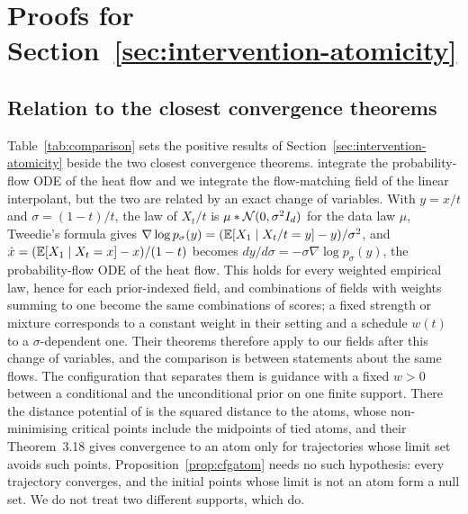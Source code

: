 \documentclass{article} %
\theoremstyle{plain}
\theoremstyle{definition}
\theoremstyle{remark}
\begin{document}
\section{Proofs for Section~\ref{sec:intervention-atomicity}}
\label{app:intervention-proofs}

\subsection{Relation to the closest convergence theorems}
\label{apx:comparison}

Table~\ref{tab:comparison} sets the positive results of Section~\ref{sec:intervention-atomicity}
beside the two closest convergence theorems. \citet{liu2025pde,liu2026geometric} integrate the
probability-flow ODE of the heat flow and we integrate the flow-matching field of the linear
interpolant, but the two are related by an exact change of variables. With $y=x/t$ and
$\sigma=(1-t)/t$, the law of $X_t/t$ is $\mu*\mathcal{N}(0,\sigma^2I_d)$ for the data law $\mu$, Tweedie's
formula gives $\nabla\log p_\sigma(y)=(\mathbb{E}[X_1\mid X_t/t=y]-y)/\sigma^2$, and
$\dot x=(\mathbb{E}[X_1\mid X_t=x]-x)/(1-t)$ becomes $dy/d\sigma=-\sigma\nabla\log p_\sigma(y)$, the
probability-flow ODE of the heat flow. This holds for every weighted empirical law, hence for each
prior-indexed field, and combinations of fields with weights summing to one become the same
combinations of scores; a fixed strength or mixture corresponds to a constant weight in their
setting and a schedule $w(t)$ to a $\sigma$-dependent one. Their theorems therefore apply to our
fields after this change of variables, and the comparison is between statements about the same
flows. The configuration that separates them is
guidance with a fixed $w>0$ between a conditional and the unconditional prior on one finite
support. There the distance potential of \citet{liu2026geometric} is the squared distance to the
atoms, whose non-minimising critical points include the midpoints of tied atoms, and their
Theorem~3.18 gives convergence to an atom only for trajectories whose limit set avoids such
points. Proposition~\ref{prop:cfgatom} needs no such hypothesis: every trajectory converges, and
the initial points whose limit is not an atom form a null set. We do not treat two different
supports, which \citet{liu2026geometric} do.
\end{document}
